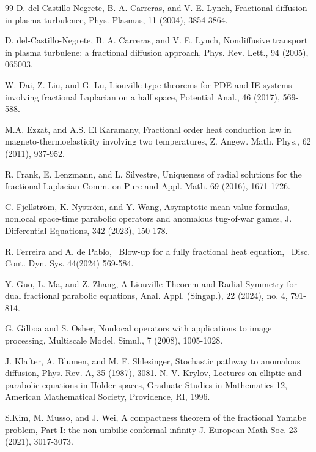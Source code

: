 \documentclass[12pt]{article}
\theoremstyle{remark}
\numberwithin{equation}{section}
\begin{document}
\begin{thebibliography}{99}
 D. del-Castillo-Negrete, B. A. Carreras, and V. E. Lynch, Fractional diffusion in plasma turbulence, Phys. Plasmas, 11 (2004), 3854-3864.

 D. del-Castillo-Negrete, B. A. Carreras, and V. E. Lynch, Nondiffusive transport in plasma turbulene: a fractional diffusion approach, Phys. Rev. Lett., 94 (2005), 065003.



W. Dai, Z. Liu, and G. Lu, Liouville type theorems for PDE and IE systems involving fractional Laplacian on a half space, Potential Anal., 46 (2017), 569-588.



 M.A. Ezzat, and A.S. El Karamany, Fractional order heat conduction law in magneto-thermoelasticity involving two temperatures, Z. Angew. Math. Phys., 62 (2011), 937-952.

 R. Frank, E. Lenzmann, and L. Silvestre,   Uniqueness of radial solutions for the fractional Laplacian
Comm. on Pure and Appl. Math. 69 (2016), 1671-1726.


 C. Fjellstr\"{o}m, K. Nystr\"{o}m, and Y. Wang, Asymptotic mean value formulas, nonlocal space-time parabolic operators and anomalous tug-of-war games, J. Differential Equations, 342 (2023), 150-178.

 R. Ferreira and A. de Pablo, \, Blow-up for a fully fractional heat equation, \, Disc. Cont. Dyn. Sys. 44(2024) 569-584.

 Y. Guo, L. Ma, and Z. Zhang, A Liouville Theorem and Radial Symmetry for dual fractional
parabolic equations, Anal. Appl. (Singap.), 22 (2024), no. 4, 791-814.

 G. Gilboa and S. Osher, Nonlocal operators with applications to image processing, Multiscale Model. Simul., 7 (2008), 1005-1028.



 J. Klafter, A. Blumen, and M. F. Shlesinger, Stochastic pathway to anomalous diffusion, Phys. Rev. A, 35 (1987), 3081.
     N. V. Krylov, Lectures on elliptic and parabolic equations in H\"{o}lder spaces, Graduate Studies in Mathematics 12, American Mathematical Society, Providence, RI, 1996.

  S.Kim,  M. Musso, and J. Wei,  A compactness theorem of the fractional Yamabe problem, Part I: the non-umbilic conformal infinity J. European Math Soc. 23 (2021), 3017-3073.


\end{thebibliography}
\end{document}
